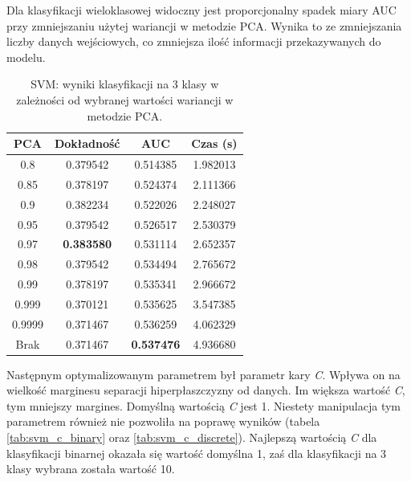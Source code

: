 \documentclass[a4paper, twoside, 11pt, openright]{article}
\begin{document}
Dla klasyfikacji wieloklasowej widoczny jest proporcjonalny spadek miary AUC przy zmniejszaniu użytej wariancji w metodzie PCA. Wynika to ze zmniejszania liczby danych wejściowych, co zmniejsza ilość informacji przekazywanych do modelu.

\begin{table}[H]
    \centering
    \begin{tabular}{|c|c|c|c|}
    \hline
        \textbf{PCA} & \textbf{Dokładność} &  \textbf{AUC} &  \textbf{Czas (s)} \\ \hline
0.8                &  0.379542 &  0.514385 &    1.982013 \\ \hline
0.85               &  0.378197 &  0.524374 &    2.111366 \\ \hline
0.9                &  0.382234 &  0.522026 &    2.248027 \\ \hline
0.95               &  0.379542 &  0.526517 &    2.530379 \\ \hline
0.97               &  \textbf{0.383580} &  0.531114 &    2.652357 \\ \hline
0.98               &  0.379542 &  0.534494 &    2.765672 \\ \hline
0.99               &  0.378197 &  0.535341 &    2.966672 \\ \hline
0.999			   &  0.370121 &  0.535625 &    3.547385 \\ \hline
0.9999             &  0.371467 &  0.536259 &    4.062329 \\ \hline
Brak                &  0.371467 &  \textbf{0.537476} &    4.936680 \\ \hline
    \end{tabular}
    \caption{SVM: wyniki klasyfikacji na 3 klasy w zależności od wybranej wartości wariancji w metodzie PCA.}
    \label{tab:svm_pca_discrete}
\end{table}


Następnym optymalizowanym parametrem był parametr kary \textit{C}. Wpływa on na wielkość marginesu separacji hiperpłaszczyzny od danych. Im większa wartość \textit{C}, tym mniejszy margines. Domyślną wartością \textit{C} jest 1. Niestety manipulacja tym parametrem również nie pozwoliła na poprawę wyników (tabela \ref{tab:svm_c_binary} oraz \ref{tab:svm_c_discrete}). Najlepszą wartością \textit{C} dla klasyfikacji binarnej okazała się wartość domyślna 1, zaś dla klasyfikacji na 3 klasy wybrana została wartość 10. 
\end{document}

